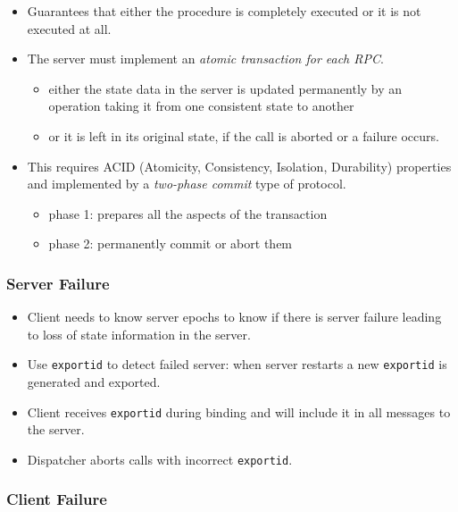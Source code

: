 \documentclass[twocolumn,landscape,10pt]{article}
\theoremstyle{definition}
\begin{document}
\begin{itemize}
    \item Guarantees that either the procedure is completely executed or it is
        not executed at all.
    \item The server must implement an \emph{atomic transaction for each RPC}.
        \begin{itemize}
            \item either the state data in the server is updated permanently by
                an operation taking it from one consistent state to another
            \item or it is left in its original state, if the call is aborted or
                a failure occurs.
        \end{itemize} 
    \item This requires ACID (Atomicity, Consistency, Isolation, Durability)
        properties and implemented by a \emph{two-phase commit} type of
        protocol.
        \begin{itemize}
            \item phase 1: prepares all the aspects of the transaction
            \item phase 2: permanently commit or abort them
        \end{itemize} 
\end{itemize} 

\subsubsection{Server Failure}

\begin{itemize}
    \item Client needs to know server epochs to know if there is server failure
        leading to loss of state information in the server.
    \item Use \texttt{exportid} to detect failed server: when server restarts a
        new \texttt{exportid} is generated and exported.
    \item Client receives \texttt{exportid} during binding and will include it
        in all messages to the server.
    \item Dispatcher aborts calls with incorrect \texttt{exportid}.
\end{itemize} 

\subsubsection{Client Failure}
\end{document}
